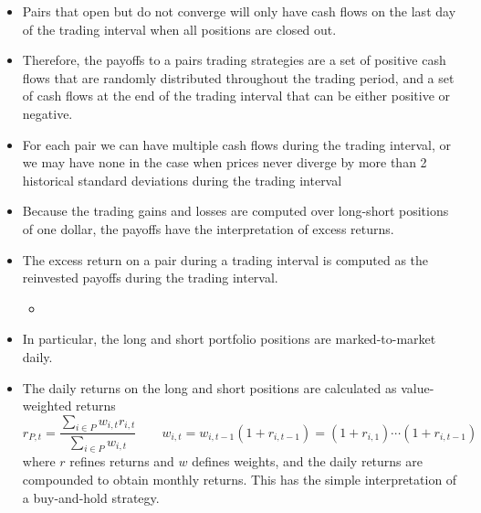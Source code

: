 \begin{itemize}
\begin{itemize}
		\item Pairs that open but do not converge will only have cash flows on the last day of the trading interval when all positions are closed out. 
		\item Therefore, the payoffs to a pairs trading strategies are a set of positive cash flows that are randomly distributed throughout the trading period, and a set of cash flows at the end of the trading interval that can be either positive or negative.
		\item For each pair we can have multiple cash flows during the trading interval, or we may have none in the case when prices never diverge by more than 2 historical standard deviations during the trading interval
		\item Because the trading gains and losses are computed over long-short positions of one dollar, the payoffs have the interpretation of excess returns. 
		\item The excess return on a pair during a trading interval is computed as the reinvested payoffs during the trading interval.
		\begin{itemize}
			\item {}
		\end{itemize}
		\item In particular, the long and short portfolio positions are marked-to-market daily.
		\item The daily returns on the long and short positions are calculated as value-weighted returns
$$
r_{P,t} = \frac{\sum_{i\in P} w_{i,t} r_{i,t}}{\sum_{i \in P} w_{i,t}}
\qquad
w_{i,t} 
= w_{i,t-1}(1+r_{i,t-1}) 
= (1+r_{i,1})\cdots (1+r_{i,t-1})  
$$
where $r$ refines returns and $w$ defines weights, and the daily returns are compounded to obtain monthly returns. This has the simple interpretation of a buy-and-hold strategy.
	\end{itemize}
\end{itemize}


